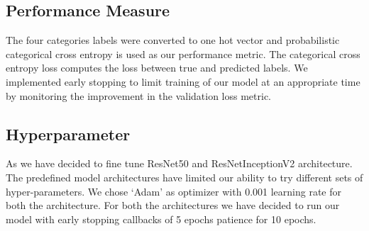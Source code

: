 \documentclass{report}
\begin{document}
\subsection{Performance Measure}
The four categories labels were converted to one hot vector and probabilistic categorical cross entropy is used as our performance metric. The categorical cross entropy loss computes the loss between true and predicted labels. We implemented early stopping to limit training of our model at an appropriate time by monitoring the improvement in the validation loss metric. 

\subsection{Hyperparameter}
As we have decided to fine tune ResNet50 and ResNetInceptionV2 architecture. The predefined model architectures have limited our ability to try different sets of hyper-parameters. We chose ‘Adam’ as optimizer with 0.001 learning rate for both the architecture. For both the architectures we have decided to run our model with early stopping callbacks of 5 epochs patience for 10 epochs.  
\end{document}
